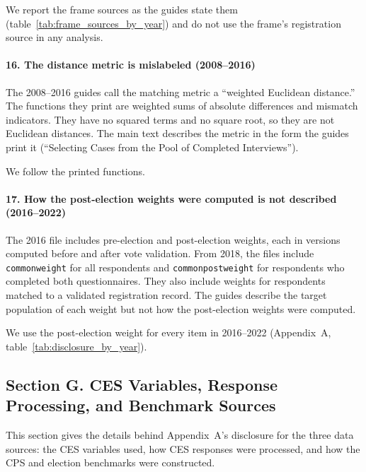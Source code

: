\documentclass[12pt]{article}
\begin{document}
We report the frame sources as the guides state them (table~\ref{tab:frame_sources_by_year}) and do not use the frame's registration source in any analysis.

\paragraph*{16. The distance metric is mislabeled (2008--2016)}
The 2008--2016 guides call the matching metric a ``weighted Euclidean distance.'' The functions they print are weighted sums of absolute differences and mismatch indicators. They have no squared terms and no square root, so they are not Euclidean distances. The main text describes the metric in the form the guides print it (``Selecting Cases from the Pool of Completed Interviews'').

We follow the printed functions.

\paragraph*{17. How the post-election weights were computed is not described (2016--2022)}
The 2016 file includes pre-election and post-election weights, each in versions computed before and after vote validation. From 2018, the files include \texttt{commonweight} for all respondents and \texttt{commonpostweight} for respondents who completed both questionnaires. They also include weights for respondents matched to a validated registration record. The guides describe the target population of each weight but not how the post-election weights were computed.

We use the post-election weight for every item in 2016--2022 (Appendix~A, table~\ref{tab:disclosure_by_year}).

\clearpage
\subsection*{Section G. CES Variables, Response Processing, and Benchmark Sources}
{}
\label{app:variables_processing_sources}

This section gives the details behind Appendix~A's disclosure for the three data sources: the CES variables used, how CES responses were processed, and how the CPS and election benchmarks were constructed.
\end{document}
